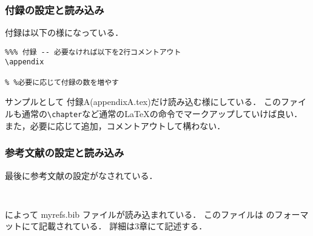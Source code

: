 \subsubsection{付録の設定と読み込み}
付録は以下の様になっている．
\begin{breakbox}
{\small
\begin{verbatim}
%%% 付録 -- 必要なければ以下を2行コメントアウト
\appendix

% %必要に応じて付録の数を増やす
\end{verbatim}
}
\end{breakbox}
サンプルとして 付録A(appendixA.tex)だけ読み込む様にしている．
このファイルも通常の\verb+\chapter+など通常の\LaTeX の命令でマークアップしていけば良い．
また，必要に応じて追加，コメントアウトして構わない．

\subsubsection{参考文献の設定と読み込み}
最後に参考文献の設定がなされている．
\begin{breakbox}
{\small
\begin{verbatim}


\end{verbatim}
}
\end{breakbox}
\verb++によって myrefs.bib ファイルが読み込まれている．
このファイルは \BibTeX のフォーマットにて記載されている．
詳細は3章にて記述する．

